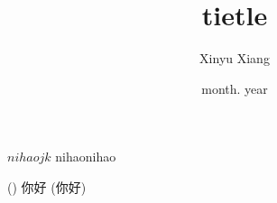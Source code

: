 \documentclass[14pt]{extarticle}
\title{\textbf{tietle}}
\author{Xinyu Xiang}
\date{month. year}
\begin{document}
\maketitle

$nihaojk$ nihaonihao


() 你好 (你好)
\end{document}
